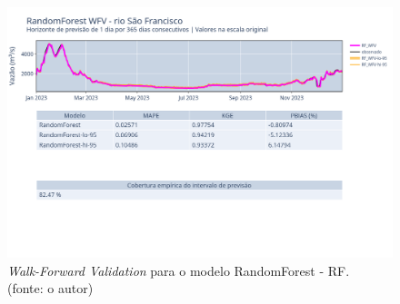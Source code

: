 \begin{figure}[!h]
	\centering
	\includegraphics[scale=0.33]{Figuras/rio_sao_francisco/wfv/RF/RF_WFV_ORIG.png}
	\caption{\textit{Walk-Forward Validation} para o modelo RandomForest - RF.\\(fonte: o autor)}
	\label{fig:francisco_RF_WFV_ORIG}
\end{figure}
\clearpage

